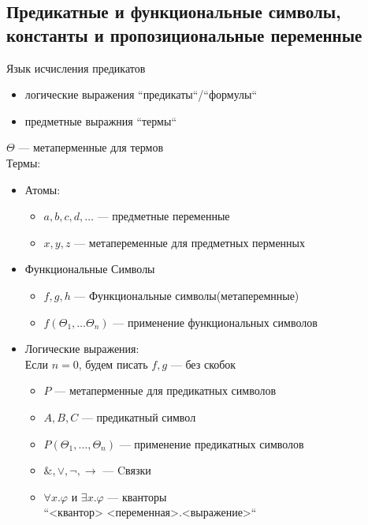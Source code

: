 \documentclass[english]{article}
\begin{document}
\subsection{Предикатные и функциональные символы, константы и пропозициональные переменные}
\label{sec:org54441cf}
\begin{definition}
	Язык исчисления предикатов
	\begin{itemize}
		\item логические выражения ``предикаты``/``формулы``
		\item предметные выражния ``термы``
	\end{itemize}
	\(\Theta\) --- метаперменные для термов \\
	Термы:
	\begin{itemize}
		\item Атомы:
		      \begin{itemize}
			      \item \(a, b, c, d, \dots\) --- предметные переменные
			      \item \(x, y, z\) --- метапеременные для предметных перменных
		      \end{itemize}
		\item Функциональные Символы
		      \begin{itemize}
			      \item \(f, g, h\) --- Функциональные символы(метаперемнные)
			      \item \(f(\Theta_1, \dots \Theta_n)\) --- применение функциональных символов
		      \end{itemize}
		\item Логические выражения: \\
		      \color{gray}Если \(n = 0\), будем писать \(f, g\) --- без скобок\color{black}
		      \begin{itemize}
			      \item \(P\) --- метаперменные для предикатных символов
			      \item \(A, B, C\) --- предикатный символ
			      \item \(P(\Theta_1, \dots, \Theta_n)\) --- применение предикатных символов
			      \item \(\&, \vee, \neg, \to\) --- Cвязки
			      \item \(\forall x.\varphi\) и \(\exists x.\varphi\) --- кванторы \\
			            \color{gray}``<квантор> <переменная>.<выражение>``\color{black} \\
		      \end{itemize}
	\end{itemize}
	\label{org2d702b9}
\end{definition}
\end{document}
